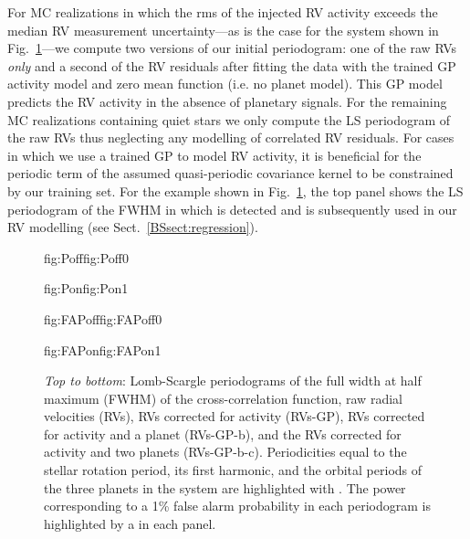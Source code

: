 For MC realizations in which the rms of the injected RV activity exceeds the median RV measurement
uncertainty---as is the case for the system shown in Fig.~\ref{BSfig:periodograms}---we compute two
versions of our initial periodogram: one of the raw RVs \emph{only} and a second
of the RV residuals after fitting the data with the trained GP activity model and zero mean function
(i.e. no planet model). This GP model predicts the RV activity in the absence of planetary signals.
For the remaining MC realizations containing quiet stars
we only compute the LS periodogram of the raw RVs thus neglecting any
modelling of correlated RV residuals. For cases in which we use a trained GP to model RV activity,
it is beneficial for
the periodic term of the assumed quasi-periodic covariance kernel to be constrained by our training set.
For the example shown in Fig.~\ref{BSfig:periodograms}, the top panel shows the LS periodogram of the FWHM
in which \prot{} is detected and is subsequently used in our RV modelling (see Sect.~\ref{BSsect:regression}).

\begin{figure}
  \centering
  \hspace{-\hsize}%
  \begin{ocg}{fig:Poff}{fig:Poff}{0}%
  \end{ocg}%
  \begin{ocg}{fig:Pon}{fig:Pon}{1}%
  \end{ocg}
  \hspace{-\hsize}%
  \begin{ocg}{fig:FAPoff}{fig:FAPoff}{0}%
  \end{ocg}%
  \begin{ocg}{fig:FAPon}{fig:FAPon}{1}%
  \end{ocg}
  \hspace{-\hsize}%
  \caption{\emph{Top to bottom}: Lomb-Scargle periodograms of the full width at half maximum (FWHM)
    of the cross-correlation function, raw radial velocities (RVs), RVs corrected for activity (RVs-GP),
    RVs corrected for activity and a planet (RVs-GP-b), and the RVs corrected for activity and two planets
    (RVs-GP-b-c). Periodicities equal to the stellar rotation period, its first harmonic, and the
    orbital periods of the three planets in the system are highlighted with
    . The power
    corresponding to a 1\% false alarm probability in each periodogram is highlighted by a  
     in each panel.}
  \label{BSfig:periodograms}
\end{figure}

